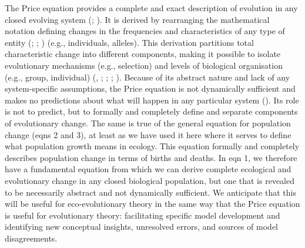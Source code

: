 \documentclass[
]{article}
\begin{document}
The Price equation provides a complete and exact description of
evolution in any closed evolving system (; ). It is derived by
rearranging the mathematical notation defining changes in the
frequencies and characteristics of any type of entity
(;
; ) (e.g., individuals, alleles). This derivation partitions total
characteristic change into different components, making it possible to
isolate evolutionary mechanisms (e.g., selection) and levels of
biological organisation (e.g., group, individual)
(, ;
;
; ). Because of its abstract nature and lack of any
system-specific assumptions, the Price equation is not dynamically
sufficient and makes no predictions about what will happen in any
particular system (). Its role
is not to predict, but to formally and completely define and separate
components of evolutionary change. The same is true of the general
equation for population change (eqns 2 and 3), at least as we have used
it here where it serves to define what population growth means in
ecology. This equation formally and completely describes population
change in terms of births and deaths. In eqn 1, we therefore have a
fundamental equation from which we can derive complete ecological and
evolutionary change in any closed biological population, but one that is
revealed to be necessarily abstract and not dynamically sufficient. We
anticipate that this will be useful for eco-evolutionary theory in the
same way that the Price equation is useful for evolutionary theory:
facilitating specific model development and identifying new conceptual
insights, unresolved errors, and sources of model disagreements.
\end{document}
